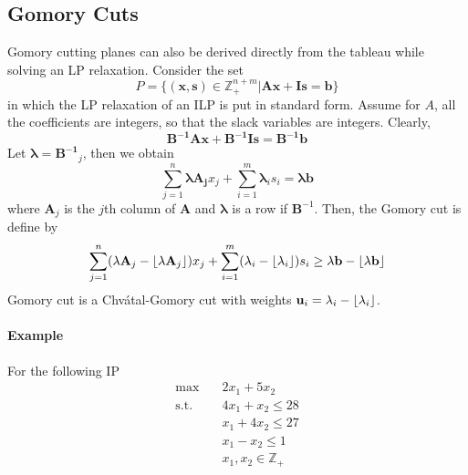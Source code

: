             \subsection{Gomory Cuts}
                Gomory cutting planes can also be derived directly from the tableau while solving an LP relaxation. Consider the set
                \begin{equation*}
                    P = \{(\mathbf{x, s}) \in \mathbb{Z}_+^{n + m}| \mathbf{Ax + Is = b}\}
                \end{equation*}
                in which the LP relaxation of an ILP is put in standard form. Assume for $A$, all the coefficients are integers, so that the slack variables are integers. Clearly,
                \begin{equation*}
                    \mathbf{B^{-1}Ax + B^{-1}Is = B^{-1}b}
                \end{equation*}
                Let $\mathbf{\lambda} = \mathbf{B^{-1}}_j$, then we obtain
                \begin{equation*}
                    \sum_{j = 1}^n \mathbf{\lambda A_j} x_j + \sum_{i = 1}^m \mathbf{\lambda}_i s_i = \mathbf{\lambda b}
                \end{equation*}
                where $\mathbf{A}_j$ is the $j$th column of $\mathbf{A}$ and $\mathbf{\lambda}$ is a row if $\mathbf{B}^{-1}$. Then, the Gomory cut is define by
                \begin{equation*}
                    \sum_{j = 1}^n (\mathbf{\lambda A}_j - \left\lfloor \mathbf{\lambda A}_j \right\rfloor) x_j + \sum_{i = 1}^m (\mathbf{\lambda}_i - \left\lfloor \mathbf{\lambda}_i \right\rfloor) s_i \ge \mathbf{\lambda b} - \left\lfloor \mathbf{\lambda b} \right\rfloor
                \end{equation*}
                Gomory cut is a Chv\'atal-Gomory cut with weights $\mathbf{u}_i = \mathbf{\lambda}_i - \left\lfloor \mathbf{\lambda}_i \right\rfloor$.

                \paragraph{Example}
                    For the following IP
                    \begin{align*}
                        \max \quad & 2 x_1 + 5 x_2\\
                        \text{s.t.} \quad & 4 x_1 + x_2 \le 28\\
                        & x_1 + 4 x_2 \le 27\\
                        & x_1 - x_2 \le 1\\
                        & x_1, x_2 \in \mathbb{Z}_+
                    \end{align*}

